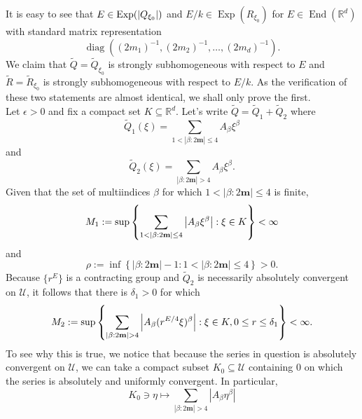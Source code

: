 \documentclass[smallextended]{svjour3}
\theoremstyle{remark}
\renewenvironment{proof}[1][\proofname]{\renewcommand\xproofname{#1}\xproof}{\endxproof}
\newcommand\End{\operatorname{End}} %
\newcommand\Exp{\operatorname{Exp}}
\newcommand\diag{\operatorname{diag}}
\begin{document}
\begin{proof}
It is easy to see that $E\in \Exp(\abs{Q_{\xi_0}})$ and $E/k\in\Exp(R_{\xi_0})$ for $E\in\End(\mathbb{R}^d)$ with standard matrix representation 
\begin{equation*}
\diag((2m_1)^{-1}, (2m_2)^{-1},\dots, (2m_d)^{-1}).
\end{equation*}
We claim that $\widetilde{Q}=\widetilde{Q}_{\xi_0}$ is strongly subhomogeneous with respect to $E$ and $\widetilde{R}=\widetilde{R}_{\xi_0}$ is strongly subhomogeneous with respect to $E/k$. As the verification of these two statements are almost identical, we shall only prove the first.\\

\noindent Let $\epsilon > 0$ and fix a compact set $K\subseteq\mathbb{R}^d$. Let's write $\widetilde{Q}=\widetilde{Q}_1+\widetilde{Q}_2$ where
\begin{equation*}
    \widetilde{Q}_1(\xi)=\sum_{1< |\beta:2\mathbf{m}|\leq 4}A_{\beta}\xi^\beta
\end{equation*}
and
\begin{equation*}
    \widetilde{Q}_2(\xi)=\sum_{ |\beta:2\mathbf{m}|>4}A_{\beta}\xi^\beta.
\end{equation*}
Given that the set of multiindices $\beta$ for which  $1<|\beta:2\mathbf{m}|\leq 4$ is finite, 
\begin{equation*}
    M_1:=\sup\left\{\sum_{1<|\beta:2\mathbf{m}|\leq 4} \abs{A_\beta\xi^\beta}:\xi\in K\right\}<\infty
\end{equation*}
and
\begin{equation*}
    \rho:=\inf\left\{|\beta:2\mathbf{m}|-1:1<|\beta:2\mathbf{m}|\leq 4\right\}>0.
\end{equation*}
Because $\{r^E\}$ is a contracting group and $\widetilde{Q}_2$ is necessarily absolutely convergent on $\mathcal{U}$, it follows that there is $\delta_1>0$ for which
\begin{equation*}
    M_2:=\sup\left\{\sum_{|\beta:2\mathbf{m}|>4}\abs{A_\beta(r^{E/4}\xi)^\beta}:\xi\in K, 0\leq r\leq\delta_1\right\}<\infty.
\end{equation*}
To see why this is true, we notice that because the series in question is absolutely convergent on $\mathcal{U}$, we can take a compact subset $K_0 \subseteq \mathcal{U}$ containing $0$ on which the series is absolutely and uniformly convergent. In particular, 
\begin{equation*}
    K_0 \ni \eta \mapsto \sum_{|\beta:2\mathbf{m}|>4}|A_{\beta}\eta^\beta|
\end{equation*}

\end{proof}
\end{document}
